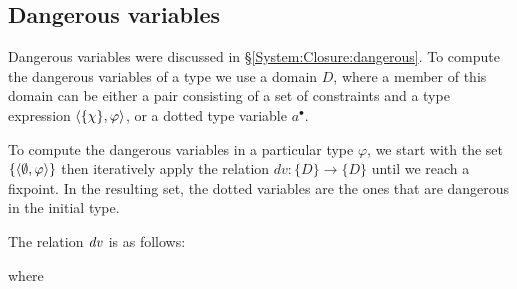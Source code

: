 \bigskip
\bigskip
\bigskip
\bigskip
\subsection{Dangerous variables}
\label{Inference:Language:dangerous-variables}
Dangerous variables were discussed in \S\ref{System:Closure:dangerous}. To compute the dangerous variables of a type we use a domain $D$, where a member of this domain can be either a pair consisting of a set of constraints and a type expression $\langle\{\chi\}, \varphi\rangle$, or a dotted type variable $a^\bullet$.


To compute the dangerous variables in a particular type $\varphi$, we start with the set $\{ \langle\emptyset, \varphi\rangle \}$ then iteratively apply the relation $dv : \{ D \} \to \{ D \}$ until we reach a fixpoint. In the resulting set, the dotted variables are the ones that are dangerous in the initial type.

\clearpage{}
The relation $\operatorname{\mathit{dv}}$ is as follows:


where


\vspace{-1ex}

